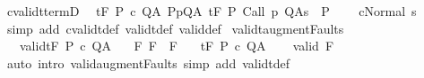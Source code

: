 \begin{isabellebody}
\endisatagproof
{\isafoldproof}%
%
\isadelimproof
\isanewline
%
\endisadelimproof
\isanewline
{}\isamarkupfalse%
\ cvalidt{\isacharunderscore}termD{\isacharcolon}\ \isanewline
\ {\isachardoublequoteopen}{\isasymlbrakk}{\isasymGamma}{\isacharcomma}{\isasymTheta}{\isasymTurnstile}\isactrlsub t\isactrlbsub {\isacharslash}F\isactrlesub \ P\ c\ Q{\isacharcomma}A{\isacharsemicolon}\ {\isasymforall}{\isacharparenleft}P{\isacharcomma}p{\isacharcomma}Q{\isacharcomma}A{\isacharparenright}{\isasymin}{\isasymTheta}{\isachardot}\ {\isasymGamma}{\isasymTurnstile}\isactrlsub t\isactrlbsub {\isacharslash}F\isactrlesub \ P\ {\isacharparenleft}Call\ p{\isacharparenright}\ Q{\isacharcomma}A{\isacharsemicolon}s\ {\isasymin}\ P{\isasymrbrakk}\ \isanewline
\ \ {\isasymLongrightarrow}\ {\isasymGamma}{\isasymturnstile}c{\isasymdown}{\isacharparenleft}Normal\ s{\isacharparenright}{\isachardoublequoteclose}\isanewline
%
\isadelimproof
\ \ %
\endisadelimproof
%
\isatagproof
{}\isamarkupfalse%
\ {\isacharparenleft}simp\ add{\isacharcolon}\ cvalidt{\isacharunderscore}def\ validt{\isacharunderscore}def\ valid{\isacharunderscore}def{\isacharparenright}%
\endisatagproof
{\isafoldproof}%
%
\isadelimproof
\isanewline
%
\endisadelimproof
\isanewline
\isanewline
{}\isamarkupfalse%
\ validt{\isacharunderscore}augment{\isacharunderscore}Faults{\isacharcolon}\isanewline
\ \ \ valid{\isacharcolon}{\isachardoublequoteopen}{\isasymGamma}{\isasymTurnstile}\isactrlsub t\isactrlbsub {\isacharslash}F\isactrlesub \ P\ c\ Q{\isacharcomma}A{\isachardoublequoteclose}\isanewline
\ \ \ F{\isacharprime}{\isacharcolon}\ {\isachardoublequoteopen}F\ {\isasymsubseteq}\ F{\isacharprime}{\isachardoublequoteclose}\isanewline
\ \ \ {\isachardoublequoteopen}{\isasymGamma}{\isasymTurnstile}\isactrlsub t\isactrlbsub {\isacharslash}F{\isacharprime}\isactrlesub \ P\ c\ Q{\isacharcomma}A{\isachardoublequoteclose}\isanewline
%
\isadelimproof
\ \ %
\endisadelimproof
%
\isatagproof
{}\isamarkupfalse%
\ valid\ F{\isacharprime}\isanewline
\ \ \isamarkupfalse%
\ {\isacharparenleft}auto\ intro{\isacharcolon}\ valid{\isacharunderscore}augment{\isacharunderscore}Faults\ simp\ add{\isacharcolon}\ validt{\isacharunderscore}def{\isacharparenright}%
\endisatagproof
{\isafoldproof}%
%
\isadelimproof
%
\endisadelimproof
%
\end{isabellebody}

